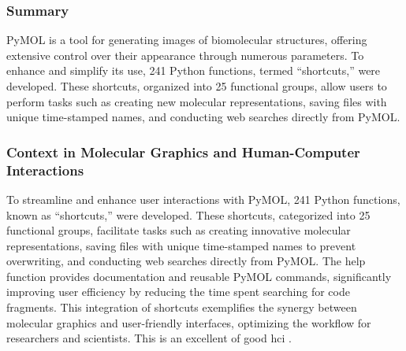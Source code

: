 
\subsubsection*{Summary} 
PyMOL is a tool for generating images of biomolecular structures, offering extensive control over their appearance through numerous parameters. 
To enhance and simplify its use, 241 Python functions, termed “shortcuts,” were developed. 
These shortcuts, organized into 25 functional groups, allow users to perform tasks such as creating new molecular representations, saving files with unique time-stamped names, and conducting web searches directly from PyMOL. 

\subsubsection*{Context in Molecular Graphics and Human-Computer Interactions} 
To streamline and enhance user interactions with PyMOL, 241 Python functions, known as “shortcuts,” were developed. 
These shortcuts, categorized into 25 functional groups, facilitate tasks such as creating innovative molecular representations, saving files with unique time-stamped names to prevent overwriting, and conducting web searches directly from PyMOL. 
The help function provides documentation and reusable PyMOL commands, significantly improving user efficiency by reducing the time spent searching for code fragments.  
This integration of shortcuts exemplifies the synergy between molecular graphics and user-friendly interfaces, optimizing the workflow for researchers and scientists.
This is an excellent of good \gls{hci} .
